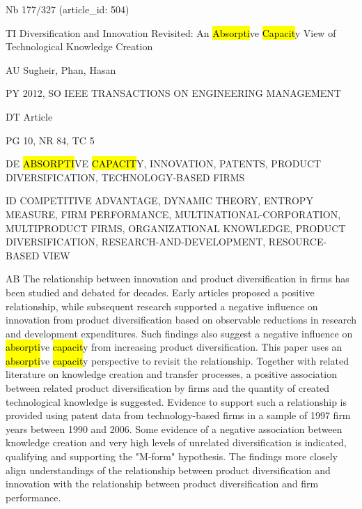 \documentclass[a4paper]{article}
\begin{document}
\vspace*{-2cm}
Nb \tabto{0cm}177/327 (article\_id: 504)\par
TI \tabto{0cm}Diversification and Innovation Revisited: An \hl{Absorpti}ve \hl{Capacit}y View of Technological Knowledge Creation\par
AU \tabto{0cm}Sugheir, Phan, Hasan\par
PY \tabto{0cm}2012, SO IEEE TRANSACTIONS ON ENGINEERING MANAGEMENT\par
DT \tabto{0cm}Article\par
PG \tabto{0cm}10, NR 84, TC 5\par
DE \tabto{0cm}\hl{ABSORPTI}VE \hl{CAPACIT}Y, INNOVATION, PATENTS, PRODUCT DIVERSIFICATION, TECHNOLOGY-BASED FIRMS\par
ID \tabto{0cm}COMPETITIVE ADVANTAGE, DYNAMIC THEORY, ENTROPY MEASURE, FIRM PERFORMANCE, MULTINATIONAL-CORPORATION, MULTIPRODUCT FIRMS, ORGANIZATIONAL KNOWLEDGE, PRODUCT DIVERSIFICATION, RESEARCH-AND-DEVELOPMENT, RESOURCE-BASED VIEW\par
AB \tabto{0cm}The relationship between innovation and product diversification in firms has been studied and debated for decades. Early articles proposed a positive relationship, while subsequent research supported a negative influence on innovation from product diversification based on observable reductions in research and development expenditures. Such findings also suggest a negative influence on \hl{absorpti}ve \hl{capacit}y from increasing product diversification. This paper uses an \hl{absorpti}ve \hl{capacit}y perspective to revisit the relationship. Together with related literature on knowledge creation and transfer processes, a positive association between related product diversification by firms and the quantity of created technological knowledge is suggested. Evidence to support such a relationship is provided using patent data from technology-based firms in a sample of 1997 firm years between 1990 and 2006. Some evidence of a negative association between knowledge creation and very high levels of unrelated diversification is indicated, qualifying and supporting the "M-form" hypothesis. The findings more closely align understandings of the relationship between product diversification and innovation with the relationship between product diversification and firm performance.\par
\clearpage
\end{document}
